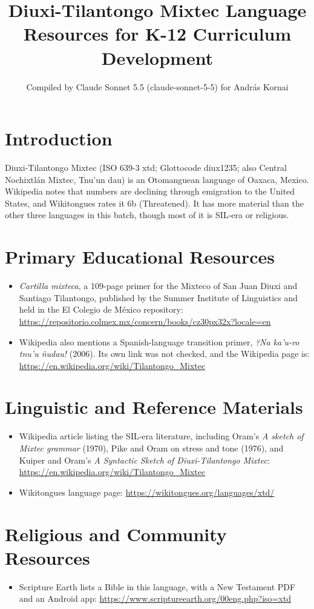\documentclass[12pt]{article}
\title{Diuxi-Tilantongo Mixtec Language Resources for K-12 Curriculum Development}
\author{Compiled by Claude Sonnet 5.5 (claude-sonnet-5-5) for Andr\'as Kornai}
\date{}
\begin{document}
\maketitle

\section{Introduction}
Diuxi-Tilantongo Mixtec (ISO 639-3 xtd; Glottocode diux1235; also Central Nochixtl\'an Mixtec, Tnu'un dau) is an Otomanguean language of Oaxaca, Mexico. Wikipedia notes that numbers are declining through emigration to the United States, and Wikitongues rates it 6b (Threatened). It has more material than the other three languages in this batch, though most of it is SIL-era or religious.

\section{Primary Educational Resources}
\begin{itemize}
\item \emph{Cartilla mixteca}, a 109-page primer for the Mixteco of San Juan Diuxi and Santiago Tilantongo, published by the Summer Institute of Linguistics and held in the El Colegio de M\'exico repository: \url{https://repositorio.colmex.mx/concern/books/cz30px32x?locale=en}
\item Wikipedia also mentions a Spanish-language transition primer, \emph{?Na ka'u-ro tnu'u \~nudau!} (2006). Its own link was not checked, and the Wikipedia page is: \url{https://en.wikipedia.org/wiki/Tilantongo_Mixtec}
\end{itemize}

\section{Linguistic and Reference Materials}
\begin{itemize}
\item Wikipedia article listing the SIL-era literature, including Oram's \emph{A sketch of Mixtec grammar} (1970), Pike and Oram on stress and tone (1976), and Kuiper and Oram's \emph{A Syntactic Sketch of Diuxi-Tilantongo Mixtec}: \url{https://en.wikipedia.org/wiki/Tilantongo_Mixtec}
\item Wikitongues language page: \url{https://wikitongues.org/languages/xtd/}
\end{itemize}

\section{Religious and Community Resources}
\begin{itemize}
\item Scripture Earth lists a Bible in this language, with a New Testament PDF and an Android app: \url{https://www.scriptureearth.org/00eng.php?iso=xtd}
\end{itemize}
\end{document}
